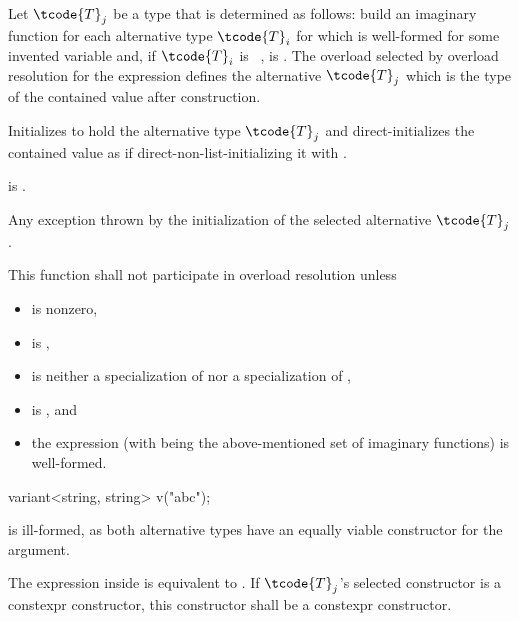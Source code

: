 \begin{itemdescr}
\pnum
Let $\tcode{T}_j$ be a type that is determined as follows:
build an imaginary function 
for each alternative type $\tcode{T}_i$
for which  
is well-formed for some invented variable  and,
if $\tcode{T}_i$ is \cv~,  is .
The overload  selected by overload
resolution for the expression  defines
the alternative $\tcode{T}_j$ which is the type of the contained value after
construction.

\pnum
\effects
Initializes  to hold the alternative type $\tcode{T}_j$ and
direct-initializes the contained value as if direct-non-list-initializing it
with .

\pnum
\ensures
{} is .

\pnum
\throws
Any exception thrown by the initialization of the selected alternative $\tcode{T}_j$.

\pnum
\remarks
This function shall not participate in overload resolution unless
\begin{itemize}
\item
   is nonzero,

\item
   is ,

\item
   is neither a specialization
  of  nor a specialization
  of ,

\item
   is , and

\item
  the expression \brk{}
  (with  being the above-mentioned set of
  imaginary functions) is well-formed.
\end{itemize}

\pnum
\begin{note}
\begin{codeblock}
variant<string, string> v("abc");
\end{codeblock}
is ill-formed, as both alternative types have an equally viable constructor
for the argument. \end{note}

\pnum
The expression inside  is equivalent to
.
If $\tcode{T}_j$'s selected constructor is a constexpr constructor,
this constructor shall be a constexpr constructor.
\end{itemdescr}

